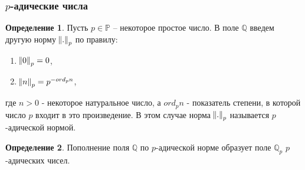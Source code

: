 \documentclass[10pt,professionalfont,utf8,presentation,compress]{beamer}
\theoremstyle{definition}
\newtheorem{defn}{Определение}
\theoremstyle{plain}
\newtheorem{exmp}{Пример}
\begin{document}
\begin{frame}
\frametitle{$p$-адические числа}

\begin{defn}
Пусть $p \in \mathbb {P}$ -- некоторое простое число. В поле $\mathbb {Q}$ введем другую норму $\norm{.}_p$ по правилу:
\begin{enumerate}
	\item $\norm{0}_p = 0$,
	\item $\norm{n}_p = p ^ {-ord_pn}$,
\end{enumerate}
\noindent где $n > 0$ - некоторое натуральное число, а $ord_pn$ - показатель степени, в которой число $p$ входит в это произведение. В этом случае норма $\norm{.}_p$ называется \mbox{$p$-адической} нормой.
\end{defn}

\begin{defn}
Пополнение поля $\mathbb {Q}$ по $p$-адической норме образует поле $\mathbb {Q}_p$ $p$-адических чисел.
\end{defn}

\end{frame}









\end{document}

